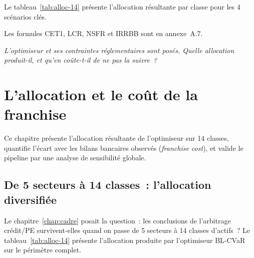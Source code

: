 \documentclass[10pt, a4paper, oneside]{report}
\theoremstyle{definition}
\begin{document}
Le tableau~\ref{tab:alloc-14} présente l'allocation résultante par classe pour les 4 scénarios clés.

Les formules CET1, LCR, NSFR et IRRBB sont en annexe~A.7.


\bigskip\noindent\textit{L'optimiseur et ses contraintes réglementaires sont posés. Quelle allocation produit-il, et qu'en coûte-t-il de ne pas la suivre~?}



\chapter{L'allocation et le coût de la franchise}
\label{chap:resultats}

Ce chapitre présente l'allocation résultante de l'optimiseur sur 14 classes, quantifie l'écart avec les bilans bancaires observés (\emph{franchise cost}), et valide le pipeline par une analyse de sensibilité globale.


\section{De 5 secteurs à 14 classes~: l'allocation diversifiée}
\label{sec:ch4:pont}

Le chapitre~\ref{chap:cadre} posait la question~: les conclusions de l'arbitrage crédit/PE survivent-elles quand on passe de 5 secteurs à 14 classes d'actifs~? Le tableau~\ref{tab:alloc-14} présente l'allocation produite par l'optimiseur BL-CVaR sur le périmètre complet.
\end{document}
